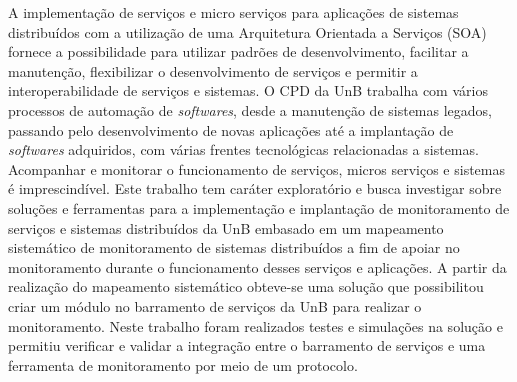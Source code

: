 A implementação de serviços e micro serviços para aplicações de sistemas distribuídos com a utilização de uma Arquitetura Orientada a Serviços (\acrshort{SOA}) fornece a possibilidade para utilizar padrões de desenvolvimento, facilitar a manutenção, flexibilizar o desenvolvimento de serviços e permitir a interoperabilidade de serviços e sistemas. O \acrfull{CPD} da \acrfull{UnB} trabalha com vários processos de automação de \textit{softwares}, desde a manutenção de sistemas legados, passando pelo desenvolvimento de novas aplicações até a implantação de \textit{softwares} adquiridos, com várias frentes tecnológicas relacionadas a sistemas. Acompanhar e monitorar o funcionamento de serviços, micros serviços e sistemas é imprescindível. Este trabalho tem caráter exploratório e busca investigar sobre soluções e ferramentas para a implementação e implantação de monitoramento de serviços e sistemas distribuídos da \acrfull{UnB} embasado em um mapeamento sistemático de monitoramento de sistemas distribuídos a fim de apoiar no monitoramento durante o funcionamento desses serviços e aplicações. A partir da realização do mapeamento sistemático obteve-se uma solução que possibilitou criar um módulo no barramento de serviços da \acrfull{UnB} para realizar o monitoramento. Neste trabalho foram realizados testes e simulações na solução e permitiu verificar e validar a integração entre o barramento de serviços e uma ferramenta de monitoramento por meio de um protocolo.






